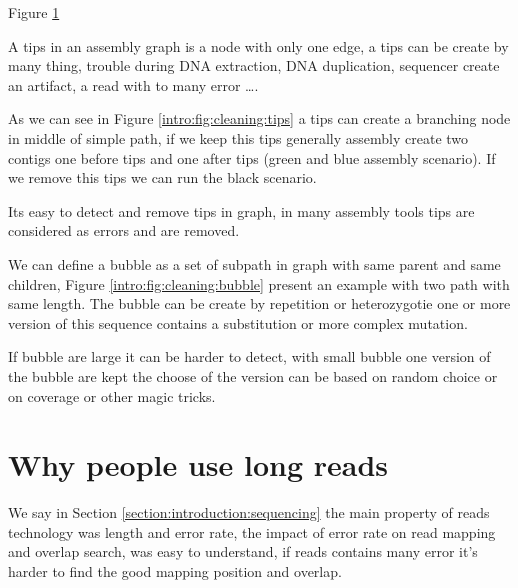 \documentclass[./main.tex]{subfiles}
\begin{document}
Figure \ref{intro:fig:cleaning}

\begin{figure}[ht]
    \caption{}
    \label{intro:fig:cleaning}
\end{figure}

A tips in an assembly graph is a node with only one edge, a tips can be create by many thing, trouble during DNA extraction, DNA duplication, sequencer create an artifact, a read with to many error ….

As we can see in Figure \ref{intro:fig:cleaning:tips} a tips can create a branching node in middle of simple path, if we keep this tips generally assembly create two contigs one before tips and one after tips (green and blue assembly scenario). If we remove this tips we can run the black scenario.

Its easy to detect and remove tips in graph, in many assembly tools tips are considered as errors and are removed.

We can define a bubble as a set of subpath in graph with same parent and same children, Figure \ref{intro:fig:cleaning:bubble} present an example with two path with same length. The bubble can be create by repetition or heterozygotie one or more version of this sequence contains a substitution or more complex mutation.

If bubble are large it can be harder to detect, with small bubble one version of the bubble are kept the choose of the version can be based on random choice or on coverage or other magic tricks.

\section{Why people use long reads}

We say in Section \ref{section:introduction:sequencing} the main property of reads technology was length and error rate, the impact of error rate on read mapping and overlap search, was easy to understand, if reads contains many error it's harder to find the good mapping position and overlap.
\end{document}
